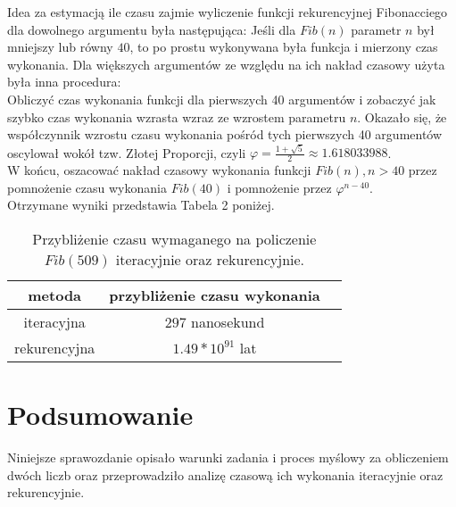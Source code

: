 \documentclass{article}
\begin{document}
Idea za estymacją ile czasu zajmie wyliczenie funkcji rekurencyjnej Fibonacciego dla dowolnego argumentu była następująca: Jeśli dla $Fib(n)$ parametr $n$ był mniejszy lub równy $40$, to po prostu wykonywana była funkcja i mierzony czas wykonania. Dla większych argumentów ze względu na ich nakład czasowy użyta była inna procedura:\vspace{1em}\\
Obliczyć czas wykonania funkcji dla pierwszych 40 argumentów i zobaczyć jak szybko czas wykonania wzrasta wzraz ze wzrostem parametru $n$. Okazało się, że współczynnik wzrostu czasu wykonania pośród tych pierwszych 40 argumentów oscylował wokół tzw. Złotej Proporcji, czyli $\varphi = \frac{1 + \sqrt{5}}{2} \approx 1.618033988$.\vspace{1em}\\
W końcu, oszacować nakład czasowy wykonania funkcji $Fib(n), n > 40$ przez pomnożenie czasu wykonania $Fib(40)$ i pomnożenie przez $\varphi^{n-40}$.\vspace{2em}\\
Otrzymane wyniki przedstawia Tabela 2 poniżej.
\begin{table}[h]
\centering
\begin{tabular}{|c|c|c|}\hline
\textbf{metoda} & \textbf{przybliżenie czasu wykonania}\\\hline
iteracyjna & $297$ nanosekund\\\hline
rekurencyjna & $1.49 * 10^{91}$ lat\\\hline
 
 
\end{tabular}
\caption{\label{tab:h2}Przybliżenie czasu wymaganego na policzenie $Fib(509)$ iteracyjnie oraz rekurencyjnie.}
\end{table}


\section{Podsumowanie}

Niniejsze sprawozdanie opisało warunki zadania i proces myślowy za obliczeniem dwóch liczb oraz przeprowadziło analizę czasową ich wykonania iteracyjnie oraz rekurencyjnie. 
\end{document}
